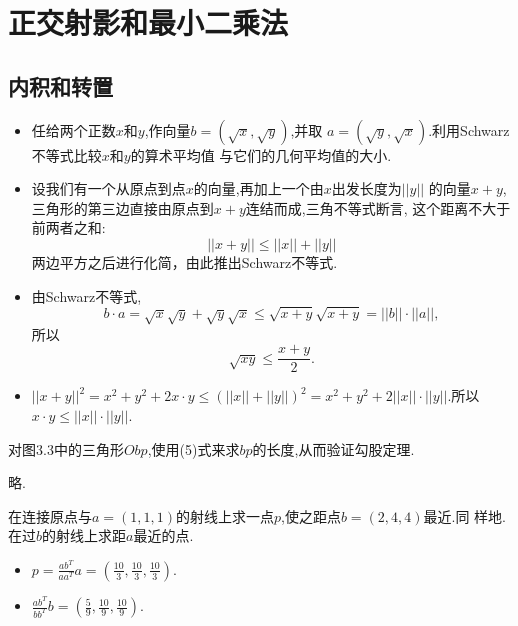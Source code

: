 ﻿\documentclass{book} \usepackage{exsheets} \usepackage{xeCJK}
\begin{document}
\chapter{正交射影和最小二乘法}
\section{内积和转置}
\begin{question}
  \begin{itemize}
  \item 任给两个正数$x$和$y$,作向量$b=(\sqrt{x},\sqrt{y})$,并取
    $a=(\sqrt{y},\sqrt{x})$.利用Schwarz不等式比较$x$和$y$的算术平均值
    与它们的几何平均值的大小.
\item 设我们有一个从原点到点$x$的向量,再加上一个由$x$出发长度为$||y||$
  的向量$x+y$,三角形的第三边直接由原点到$x+y$连结而成,三角不等式断言,
  这个距离不大于前两者之和:
$$
||x+y||\leq ||x||+||y||
$$
两边平方之后进行化简，由此推出Schwarz不等式.
  \end{itemize}
\end{question}
\begin{solution}
  \begin{itemize}
  \item 由Schwarz不等式,
$$
b\cdot a=\sqrt{x}\sqrt{y}+\sqrt{y}\sqrt{x}\leq
\sqrt{x+y}\sqrt{x+y}=||b||\cdot ||a||,
$$
所以
$$
\sqrt{xy}\leq \frac{x+y}{2}.
$$
\item $||x+y||^2=x^2+y^2+2x\cdot y\leq
  (||x||+||y||)^2=x^2+y^2+2||x||\cdot ||y||$.所以
$x\cdot y\leq ||x||\cdot ||y||$.
  \end{itemize}
\end{solution}
\begin{question}
  对图3.3中的三角形$Obp$,使用(5)式来求$bp$的长度,从而验证勾股定理.
\end{question}
\begin{solution}
  略.
\end{solution}
\begin{question}
  在连接原点与$a=(1,1,1)$的射线上求一点$p$,使之距点$b=(2,4,4)$最近.同
  样地.在过$b$的射线上求距$a$最近的点.
\end{question}
\begin{solution}
  \begin{itemize}
  \item
    $p=\frac{ab^T}{aa^{T}}a=(\frac{10}{3},\frac{10}{3},\frac{10}{3})$.
\item $\frac{ab^T}{bb^T}b=(\frac{5}{9},\frac{10}{9},\frac{10}{9})$.
  \end{itemize}
\end{solution}
\end{document}
